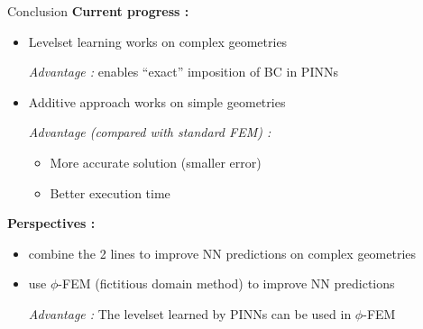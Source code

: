 \begin{frame}[label={lastslide}]{Conclusion}
	\textbf{Current progress :}
	\begin{itemize}[]
		\item Levelset learning works on complex geometries
		
		\textit{Advantage :} enables “exact” imposition of BC in PINNs
		
		\item Additive approach works on simple geometries
		
		\textit{Advantage (compared with standard FEM) :}
		\begin{itemize}[-]
			\item More accurate solution (smaller error) 
			\item Better execution time
		\end{itemize}
	\end{itemize}
	
	\textbf{Perspectives :}
	\begin{itemize}[]
		\item combine the 2 lines to improve NN predictions on complex geometries
		\item use $\phi$-FEM (fictitious domain method) to improve NN predictions
		
		\textit{Advantage :} The levelset learned by PINNs can be used in $\phi$-FEM
	\end{itemize}
\end{frame}

